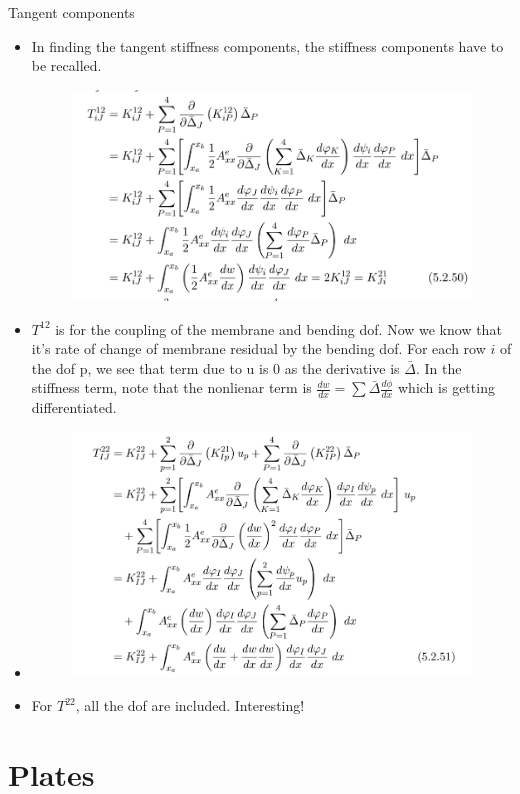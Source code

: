 	\begin{frame}{Tangent components}
		\begin{itemize}
			\item In finding the tangent stiffness components, the stiffness components have to be recalled. 
			\begin{figure}
				\centering
				\includegraphics[width=0.7\linewidth]{Figure/4}
				\label{fig:4}
			\end{figure}
			\item $T^{12}$ is for the coupling of the membrane and bending dof. Now we know that it's rate of change of membrane residual by the bending dof. For each row $i$ of the dof p, we see that term due to u is 0 as the derivative is $\bar{\Delta}$. In the stiffness term, note that the nonlienar term is $\frac{dw}{dx} = \sum \bar{\Delta} \frac{d \phi}{dx}$ which is getting differentiated.
		\end{itemize}
	\end{frame}


	\begin{frame}
		\begin{itemize}
			\item %
			\begin{figure}
				\centering
				\includegraphics[width=0.7\linewidth]{Figure/5}
				\label{fig:5}
			\end{figure}
			 \item For $T^{22}$, all the dof are included. Interesting!
			
		\end{itemize}
	\end{frame}


\section{Plates}


	\begin{frame}
		
	\end{frame}

